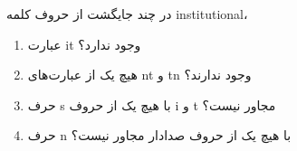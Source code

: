 \p    
در چند جایگشت از حروف کلمه
{\large institutional}،
\begin{enumerate}
    \item 
    عبارت it وجود ندارد؟
    \item
    هیچ یک از عبارت‌های nt و tn وجود ندارند؟
    \item
    حرف s با هیچ یک از حروف i و t مجاور نیست؟
    \item
    حرف n با هیچ یک از حروف صدادار مجاور نیست؟
\end{enumerate}